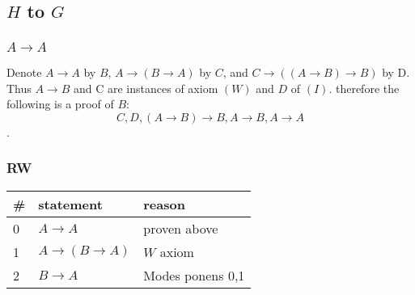 \documentclass{article}
\begin{document}
\subsection{$H$ to $G$}
\subsubsection{$A \to A$}
Denote $A \to A$ by $B$, $A \to (B \to A)$ by $C$, and $C \to
((A\to B) \to B)$ by D. Thus $A \to B$ and C are instances of
axiom $(W)$ and $D$ of $(I)$. therefore the following is a proof
of $B$: 
\[C,D,(A\to B)\to B, A \to B, A \to A\].

\subsubsection{RW}
\begin{tabular}{@{}l|ll@{}}
\#& statement			&reason \\ \toprule
0& $A \to A$			& proven above \\
1& $A \to (B \to A)$ & $W$ axiom\\
2& $B \to A$		&Modes ponens 0,1
\end{tabular}
\end{document}
